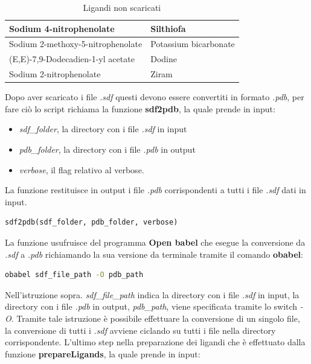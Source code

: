 \begin{table}[H]
    \centering
    \begin{tabular}{|l|l|}
    \hline
    Sodium 4-nitrophenolate & Silthiofa \\ \hline
    Sodium 2-methoxy-5-nitrophenolate & Potassium bicarbonate \\ \hline
    (E,E)-7,9-Dodecadien-1-yl acetate & Dodine \\ \hline
    Sodium 2-nitrophenolate & Ziram \\ \hline
    \end{tabular}
    \caption{Ligandi non scaricati}
    \label{tab:Ligandi scartati}
\end{table}

Dopo aver scaricato i file \textit{.sdf} questi devono essere convertiti in formato \textit{.pdb}, per fare ciò lo script richiama la funzione \textbf{sdf2pdb}, la quale prende in input:

\begin{itemize}
    \item \textit{sdf\_folder}, la directory con i file \textit{.sdf} in input
    \item \textit{pdb\_folder}, la directory con i file \textit{.pdb} in output
    \item \textit{verbose}, il flag relativo al verbose.
\end{itemize}

La funzione restituisce in output i file \textit{.pdb} corrispondenti a tutti i file \textit{.sdf} dati in input.

\begin{lstlisting}[language=Python, label=lst:code7, caption={funzione sdf2pdb}]
sdf2pdb(sdf_folder, pdb_folder, verbose)
\end{lstlisting}

La funzione usufruisce del programma \textbf{Open babel} che esegue la conversione da \textit{.sdf} a \textit{.pdb} richiamando la sua versione da terminale tramite il comando \textbf{obabel}:

\begin{lstlisting}[language=Bash, label=lst:code8, caption={Comando per la conversione da .sdf a .pdb}]
obabel sdf_file_path -O pdb_path
\end{lstlisting}

Nell'istruzione sopra. \textit{sdf\_file\_path} indica la directory con i file \textit{.sdf} in input, la directory con i file \textit{.pdb} in output, \textit{pdb\_path}, viene specificata tramite lo switch \textit{-O}. Tramite tale istruzione è possibile effettuare la conversione di un singolo file, la conversione di tutti i \textit{.sdf} avviene ciclando su tutti i file nella directory corrispondente.\newline
L'ultimo step nella preparazione dei ligandi che è effettuato dalla funzione \textbf{prepareLigands}, la quale prende in input:

